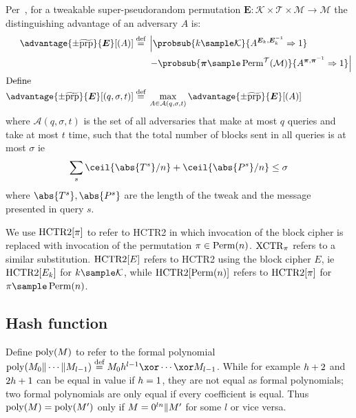 \documentclass[hctr2.tex]{subfiles}
\begin{document}
Per~\cite{cmc}, for a tweakable super-pseudorandom permutation
$\bm{E} : \mathcal{K} \times \mathcal{T} \times \mathcal{M} \rightarrow \mathcal{M}$
the distinguishing advantage of an adversary $A$ is:
%
\begin{align*}
    \advantage{\pm \widetilde{\mathrm{prp}}}{\bm{E}}[(A)] \defeq
    {}&\left\lvert\probsub{k \sample \mathcal{K}}{A^{\bm{E}_k,\bm{E}_k^{-1}}\Rightarrow 1}\right.
    \\
    {}&\left. - \probsub{\bm{\pi} \sample \Perm^\mathcal{T}(\mathcal{M})}
        {A^{\bm{\pi},\bm{\pi}^{-1}}\Rightarrow 1}\right\rvert
    \\
    \intertext{Define}
    \advantage{\pm \widetilde{\mathrm{prp}}}{\bm{E}}[(q, \sigma, t)]
    \defeq {}&
    \max_{A \in \mathcal{A}(q, \sigma, t)} \advantage{\pm \widetilde{\mathrm{prp}}}{\bm{E}}[(A)]
\end{align*}
where \(\mathcal{A}(q, \sigma, t)\)
is the set of all adversaries 
that make at most \(q\) queries
and take at most \(t\) time,
such that the total number of blocks sent in all queries is
at most \(\sigma\) ie
\begin{displaymath}
    \sum_s \ceil{\abs{T^s}/n} + \ceil{\abs{P^s}/n} \leq \sigma
\end{displaymath}
where \(\abs{T^s}, \abs{P^s}\) are the length of the tweak and the message presented in query \(s\).

We use \(\operatorname{HCTR2}[\pi]\) to refer to HCTR2 in which invocation
of the block cipher is replaced with invocation of the
permutation \(\pi \in \operatorname{Perm}(n)\).
\(\operatorname{XCTR}_\pi\) refers to a similar substitution.
\(\operatorname{HCTR2}[E]\) refers to HCTR2 using the block cipher \(E\),
ie \(\operatorname{HCTR2}[E_k]\) for \(k \sample \mathcal{K}\), while
\(\operatorname{HCTR2}[\operatorname{Perm}(n)]\) refers to \(\operatorname{HCTR2}[\pi]\)
for \(\pi \sample \Perm(n)\).

\subsection{Hash function}\label{hproperties}
Define \(\operatorname{poly}(M)\) to refer to the formal polynomial
\(\poly(M_0 \Concat \cdots \Concat M_{l-1})
\defeq  M_0\hpoly^{l-1} \xor \cdots \xor M_{l-1}\).
While for example \(h + 2\) and \(2h + 1\) can be equal
in value if \(h = 1\),
they are not equal as formal polynomials;
two formal polynomials are only equal
if every coefficient is equal. Thus \(\operatorname{poly}(M) = \operatorname{poly}(M')\)
only if \(M = 0^{ln} \Vert M'\) for some \(l\) or vice versa.
\end{document}
